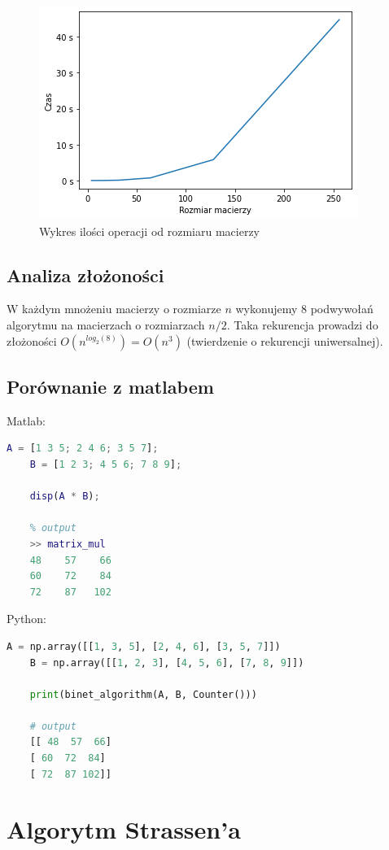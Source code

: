 \documentclass[12pt,a4paper,table]{article}
\begin{document}
    \begin{figure}[H]
        \centering
        \includegraphics[width=0.6\linewidth]{img/binet_times.png}
        \caption{Wykres ilości operacji od rozmiaru macierzy}
        \label{fig:binet_flops}
    \end{figure}

    \subsection{Analiza złożoności}
    W każdym mnożeniu macierzy o rozmiarze $n$ wykonujemy 8 podwywołań
    algorytmu na macierzach o rozmiarzach $n/2$. Taka rekurencja prowadzi do
    złożoności $O(n^{log_2(8)}) = O(n^{3})$  (twierdzenie o rekurencji uniwersalnej).

    \subsection{Porównanie z matlabem}
    Matlab:
    \begin{lstlisting}[language=Matlab]
    A = [1 3 5; 2 4 6; 3 5 7];
    B = [1 2 3; 4 5 6; 7 8 9];

    disp(A * B);

    % output
    >> matrix_mul
    48    57    66
    60    72    84
    72    87   102
    \end{lstlisting}
    Python:
    \begin{lstlisting}[language=Python]
    A = np.array([[1, 3, 5], [2, 4, 6], [3, 5, 7]])
    B = np.array([[1, 2, 3], [4, 5, 6], [7, 8, 9]])

    print(binet_algorithm(A, B, Counter()))

    # output
    [[ 48  57  66]
    [ 60  72  84]
    [ 72  87 102]]
    \end{lstlisting}
    
    \newpage

    \section{Algorytm Strassen'a}
\end{document}
